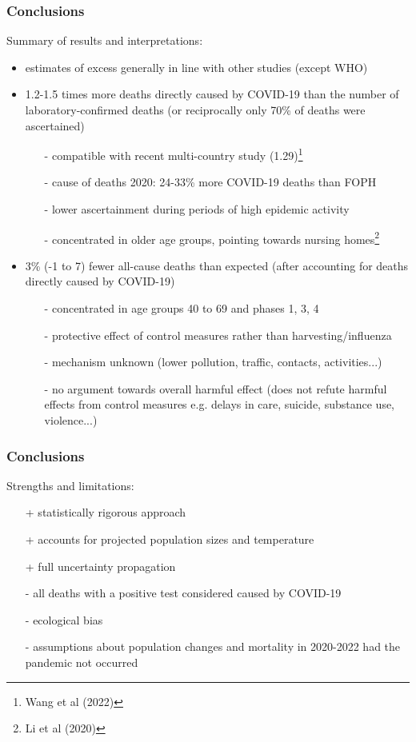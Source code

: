 \documentclass[10pt]{beamer}
\begin{document}
\begin{frame}
\frametitle{Conclusions}
Summary of results and interpretations:
\begin{itemize}
	\item estimates of excess generally in line with other studies (except WHO)
	\item \alert{1.2-1.5 times more deaths directly caused by COVID-19} than the number of laboratory-confirmed deaths (or reciprocally only 70\% of deaths were ascertained)
	\begin{itemize}
		\item[-] compatible with recent multi-country study (1.29)\footnote{Wang et al (2022)}
		\item[-] cause of deaths 2020: 24-33\% more COVID-19 deaths than FOPH
		\item[-] lower ascertainment during periods of high epidemic activity
		\item[-]concentrated in older age groups, pointing towards nursing homes\footnote{Li et al (2020)}
	\end{itemize}
	\item \alert{3\% (-1 to 7) fewer all-cause deaths than expected} (after accounting for deaths directly caused by COVID-19)
	\begin{itemize}
		\item[-] concentrated in age groups 40 to 69 and phases 1, 3, 4
		\item[-] protective effect of control measures rather than harvesting/influenza
		\item[-] mechanism unknown (lower pollution, traffic, contacts, activities...)
		\item[-] no argument towards overall harmful effect (does not refute harmful effects from control measures e.g. delays in care, suicide, substance use, violence...)
	\end{itemize}
\end{itemize} 
\end{frame}

\begin{frame}
	\frametitle{Conclusions}
Strengths and limitations:
\begin{itemize}
	\item[+] statistically rigorous approach
	\item[+] accounts for projected population sizes and temperature
	\item[+] full uncertainty propagation
	\item[-] all deaths with a positive test considered caused by COVID-19
	\item[-] ecological bias
	\item[-] assumptions about population changes and mortality in 2020-2022 had the pandemic not occurred
\end{itemize}
\end{frame}
\end{document}
